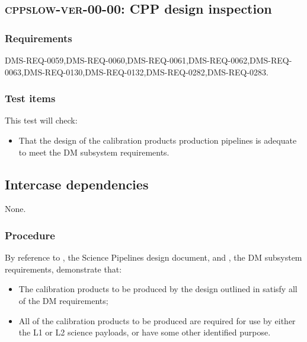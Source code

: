 \subsection{\textsc{cppslow-ver-00-00}: CPP design inspection}
\label{cppslow-ver-00-00}

\subsubsection{Requirements}

DMS-REQ-0059,DMS-REQ-0060,DMS-REQ-0061,DMS-REQ-0062,DMS-REQ-0063,DMS-REQ-0130,DMS-REQ-0132,DMS-REQ-0282,DMS-REQ-0283.

\subsubsection{Test items}

This test will check:

\begin{itemize}

  \item{That the design of the calibration products production pipelines is
  adequate to meet the DM subsystem requirements.}

\end{itemize}

\subsection{Intercase dependencies}

None.

\subsubsection{Procedure}

By reference to , the Science Pipelines design document, and
, the DM subsystem requirements, demonstrate that:

\begin{itemize}

  \item{The calibration products to be produced by the design outlined in
   satisfy all of the DM requirements;}
  \item{All of the calibration products to be produced are required for use by
  either the L1 or L2 science payloads, or have some other identified
  purpose.}

\end{itemize}

